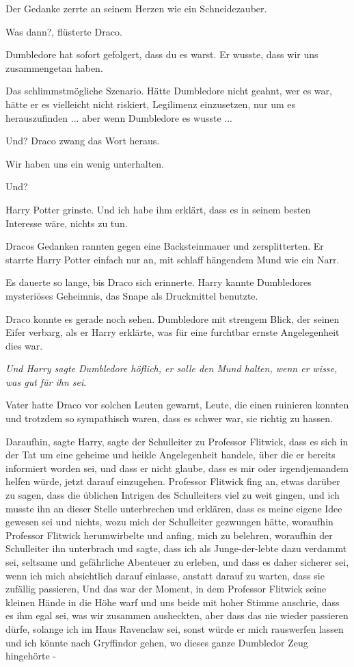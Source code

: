 Der Gedanke zerrte an seinem Herzen wie ein Schneidezauber.

\glqq{}Was dann?\grqq{}, flüsterte Draco.

\glqq{}Dumbledore hat sofort gefolgert, dass du es warst. Er wusste, dass wir
uns zusammengetan haben.\grqq{}

Das schlimmstmögliche Szenario. Hätte Dumbledore nicht geahnt, wer es war, hätte
er es vielleicht nicht riskiert, Legilimenz einzusetzen, nur um es
herauszufinden ... aber wenn Dumbledore es wusste ...

\glqq{}Und?\grqq{} Draco zwang das Wort heraus.

\glqq{}Wir haben uns ein wenig unterhalten.\grqq{}

\glqq{}Und?\grqq{}

Harry Potter grinste. \glqq{}Und ich habe ihm erklärt, dass es in seinem besten
Interesse wäre, nichts zu tun.\grqq{}

Dracos Gedanken rannten gegen eine Backsteinmauer und zersplitterten. Er starrte
Harry Potter einfach nur an, mit schlaff hängendem Mund wie ein Narr.

Es dauerte so lange, bis Draco sich erinnerte. Harry kannte Dumbledores
mysteriöses Geheimnis, das Snape als Druckmittel benutzte.

Draco konnte es gerade noch sehen. Dumbledore mit strengem Blick, der seinen
Eifer verbarg, als er Harry erklärte, was für eine furchtbar ernste
Angelegenheit dies war.


\emph{Und Harry sagte Dumbledore höflich, er solle den Mund halten, wenn er
wisse, was gut für ihn sei}.

Vater hatte Draco vor solchen Leuten gewarnt, Leute, die einen ruinieren konnten
und trotzdem so sympathisch waren, dass es schwer war, sie richtig zu hassen.

\glqq{}Daraufhin\grqq{}, sagte Harry, \glqq{}sagte der Schulleiter zu Professor
Flitwick, dass es sich in der Tat um eine geheime und heikle Angelegenheit
handele, über die er bereits informiert worden sei, und dass er nicht glaube,
dass es mir oder irgendjemandem helfen würde, jetzt darauf einzugehen. Professor
Flitwick fing an, etwas darüber zu sagen, dass die üblichen Intrigen des
Schulleiters viel zu weit gingen, und ich musste ihn an dieser Stelle
unterbrechen und erklären, dass es meine eigene Idee gewesen sei und nichts,
wozu mich der Schulleiter gezwungen hätte, woraufhin Professor Flitwick
herumwirbelte und anfing, mich zu belehren, woraufhin der Schulleiter ihn
unterbrach und sagte, dass ich als Junge-der-lebte dazu verdammt sei, seltsame
und gefährliche Abenteuer zu erleben, und dass es daher sicherer sei, wenn ich
mich absichtlich darauf einlasse, anstatt darauf zu warten, dass sie zufällig
passieren, Und das war der Moment, in dem Professor Flitwick seine kleinen Hände
in die Höhe warf und uns beide mit hoher Stimme anschrie, dass es ihm egal sei,
was wir zusammen ausheckten, aber dass das nie wieder passieren dürfe, solange
ich im Haus Ravenclaw sei, sonst würde er mich rauswerfen lassen und ich könnte
nach Gryffindor gehen, wo dieses ganze Dumbledor Zeug hingehörte -\grqq{}

